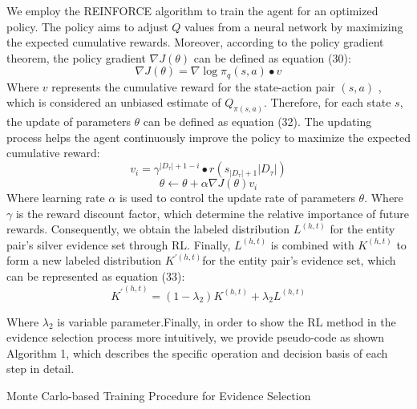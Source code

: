 \documentclass[preprint,12pt]{elsarticle}
\begin{document}
\begin{enumerate}
We employ the REINFORCE algorithm to train the agent for an optimized policy. The policy aims to adjust $Q$ values from a neural network by maximizing the expected cumulative rewards. Moreover, according to the policy gradient theorem, the policy gradient $
\nabla J(\theta)$ can be defined as equation (30):
\begin{equation}
\nabla J(\theta) = \nabla{\log{\pi_{q}\left( {s,a} \right)}} \bullet v
\label{eq30}
\end{equation}
Where $v$ represents the cumulative reward for the state-action pair $(s,a)$ , which is considered an unbiased estimate of $Q_{\pi(s,a)}$. Therefore, for each state $s$, the update of parameters $\theta$ can be defined as equation (32). The updating process helps the agent continuously improve the policy to maximize the expected cumulative reward:
\begin{equation}
v_{i} = \gamma^{{|D_{\tau}|} + 1 - i} \bullet r\left( {s_{{|D_{\tau}|} + 1}\left| D_{\tau} \right|} \right)
\label{eq31}
\end{equation}
\begin{equation}
\left. \theta\leftarrow\theta + \alpha\nabla J(\theta)v_{i} \right.
\label{eq32}
\end{equation}
Where learning rate $\alpha$ is used to control the update rate of parameters $\theta$. Where $\gamma$ is the reward discount factor, which determine the relative importance of future rewards. Consequently, we obtain the labeled distribution $L^{(h,t)}$ for the entity pair's silver evidence set through RL. Finally, $L^{(h,t)}$ is combined with $K^{(h,t)}$ to form a new labeled distribution $K^{'(h,t)}$for the entity pair's evidence set, which can be represented as equation (33):
\begin{equation}
{K^{'}}^{(h,t)} = \left( {1 - \lambda_{2}} \right)K^{(h,t)} + {\lambda_{2}L}^{({h,t})}
\label{eq33}
\end{equation}

Where $\lambda_2$ is variable parameter.Finally, in order to show the RL method in the evidence selection process more intuitively, we provide pseudo-code as shown Algorithm 1, which describes the specific operation and decision basis of each step in detail.

\begin{algorithm}[H]
\small
\caption{Monte Carlo-based Training Procedure for Evidence Selection}


\end{algorithm}
\end{enumerate}
\end{document}
